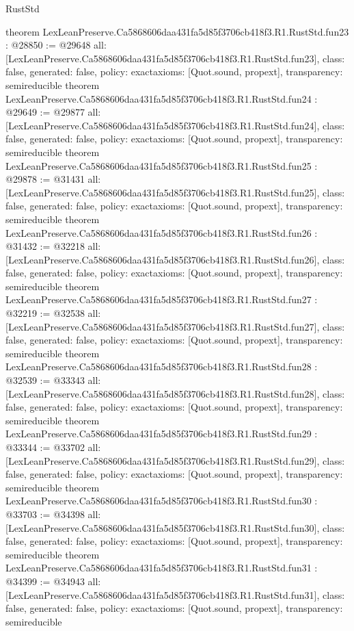 \begin{lexlean}{RustStd}
\begin{coremodule}
{}
theorem LexLeanPreserve.Ca5868606daa431fa5d85f3706cb418f3.R1.RustStd.fun23 : @28850 := @29648 {
  all: [LexLeanPreserve.Ca5868606daa431fa5d85f3706cb418f3.R1.RustStd.fun23],
  class: false,
  generated: false,
  policy: exact{axioms: [Quot.sound, propext]},
  transparency: semireducible
}
theorem LexLeanPreserve.Ca5868606daa431fa5d85f3706cb418f3.R1.RustStd.fun24 : @29649 := @29877 {
  all: [LexLeanPreserve.Ca5868606daa431fa5d85f3706cb418f3.R1.RustStd.fun24],
  class: false,
  generated: false,
  policy: exact{axioms: [Quot.sound, propext]},
  transparency: semireducible
}
theorem LexLeanPreserve.Ca5868606daa431fa5d85f3706cb418f3.R1.RustStd.fun25 : @29878 := @31431 {
  all: [LexLeanPreserve.Ca5868606daa431fa5d85f3706cb418f3.R1.RustStd.fun25],
  class: false,
  generated: false,
  policy: exact{axioms: [Quot.sound, propext]},
  transparency: semireducible
}
theorem LexLeanPreserve.Ca5868606daa431fa5d85f3706cb418f3.R1.RustStd.fun26 : @31432 := @32218 {
  all: [LexLeanPreserve.Ca5868606daa431fa5d85f3706cb418f3.R1.RustStd.fun26],
  class: false,
  generated: false,
  policy: exact{axioms: [Quot.sound, propext]},
  transparency: semireducible
}
theorem LexLeanPreserve.Ca5868606daa431fa5d85f3706cb418f3.R1.RustStd.fun27 : @32219 := @32538 {
  all: [LexLeanPreserve.Ca5868606daa431fa5d85f3706cb418f3.R1.RustStd.fun27],
  class: false,
  generated: false,
  policy: exact{axioms: [Quot.sound, propext]},
  transparency: semireducible
}
theorem LexLeanPreserve.Ca5868606daa431fa5d85f3706cb418f3.R1.RustStd.fun28 : @32539 := @33343 {
  all: [LexLeanPreserve.Ca5868606daa431fa5d85f3706cb418f3.R1.RustStd.fun28],
  class: false,
  generated: false,
  policy: exact{axioms: [Quot.sound, propext]},
  transparency: semireducible
}
theorem LexLeanPreserve.Ca5868606daa431fa5d85f3706cb418f3.R1.RustStd.fun29 : @33344 := @33702 {
  all: [LexLeanPreserve.Ca5868606daa431fa5d85f3706cb418f3.R1.RustStd.fun29],
  class: false,
  generated: false,
  policy: exact{axioms: [Quot.sound, propext]},
  transparency: semireducible
}
theorem LexLeanPreserve.Ca5868606daa431fa5d85f3706cb418f3.R1.RustStd.fun30 : @33703 := @34398 {
  all: [LexLeanPreserve.Ca5868606daa431fa5d85f3706cb418f3.R1.RustStd.fun30],
  class: false,
  generated: false,
  policy: exact{axioms: [Quot.sound, propext]},
  transparency: semireducible
}
theorem LexLeanPreserve.Ca5868606daa431fa5d85f3706cb418f3.R1.RustStd.fun31 : @34399 := @34943 {
  all: [LexLeanPreserve.Ca5868606daa431fa5d85f3706cb418f3.R1.RustStd.fun31],
  class: false,
  generated: false,
  policy: exact{axioms: [Quot.sound, propext]},
  transparency: semireducible
}
\end{coremodule}
\end{lexlean}
